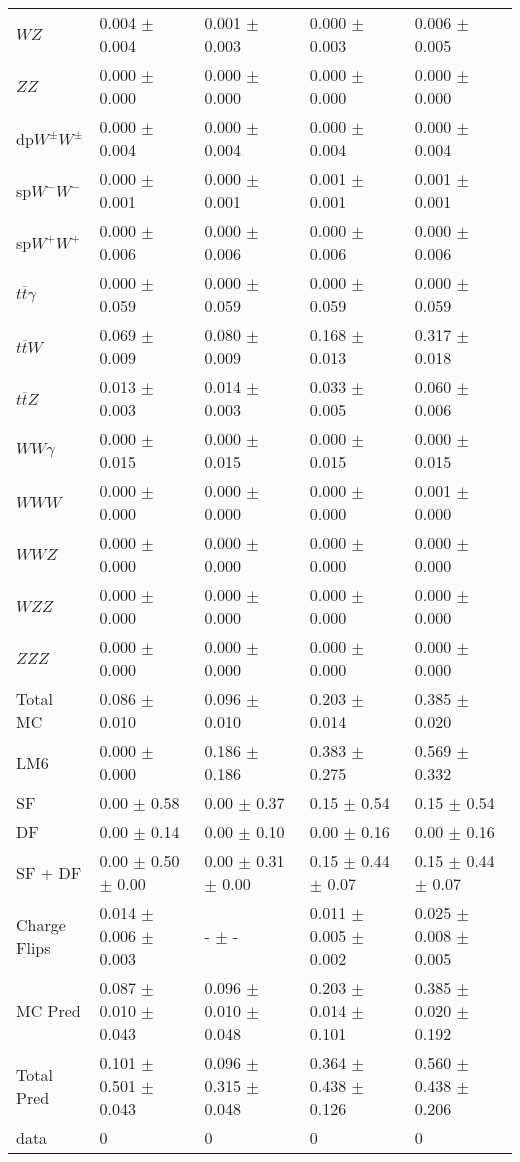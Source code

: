 \begin{tabular}{l | l l l l}
$WZ$ &  0.004 $\pm$  0.004 &  0.001 $\pm$  0.003 &   0.000 $\pm$  0.003 &  0.006 $\pm$  0.005\\
$ZZ$ &  0.000 $\pm$   0.000 &  0.000 $\pm$   0.000 &   0.000 $\pm$   0.000 &   0.000 $\pm$   0.000\\
\hline
dp$W^{\pm}W^{\pm}$ &  0.000 $\pm$  0.004 &  0.000 $\pm$  0.004 &  0.000 $\pm$  0.004 &  0.000 $\pm$  0.004\\
sp$W^{-}W^{-}$ &  0.000 $\pm$  0.001 &  0.000 $\pm$  0.001 &  0.001 $\pm$  0.001 &  0.001 $\pm$  0.001\\
sp$W^{+}W^{+}$ &  0.000 $\pm$  0.006 &  0.000 $\pm$  0.006 &  0.000 $\pm$  0.006 &  0.000 $\pm$  0.006\\
$t\overline{t}\gamma$ &  0.000 $\pm$  0.059 &  0.000 $\pm$  0.059 &  0.000 $\pm$  0.059 &  0.000 $\pm$  0.059\\
$t\overline{t}W$ &  0.069 $\pm$  0.009 &  0.080 $\pm$  0.009 &  0.168 $\pm$  0.013 &  0.317 $\pm$  0.018\\
$t\overline{t}Z$ &  0.013 $\pm$  0.003 &  0.014 $\pm$  0.003 &  0.033 $\pm$  0.005 &  0.060 $\pm$  0.006\\
$WW\gamma$ &  0.000 $\pm$  0.015 &  0.000 $\pm$  0.015 &  0.000 $\pm$  0.015 &  0.000 $\pm$  0.015\\
$WWW$ &  0.000 $\pm$   0.000 &   0.000 $\pm$   0.000 &   0.000 $\pm$   0.000 &  0.001 $\pm$   0.000\\
$WWZ$ &  0.000 $\pm$   0.000 &  0.000 $\pm$   0.000 &  0.000 $\pm$   0.000 &  0.000 $\pm$   0.000\\
$WZZ$ &   0.000 $\pm$   0.000 &  0.000 $\pm$   0.000 &   0.000 $\pm$   0.000 &   0.000 $\pm$   0.000\\
$ZZZ$ &  0.000 $\pm$   0.000 &  0.000 $\pm$   0.000 &  0.000 $\pm$   0.000 &  0.000 $\pm$   0.000\\
\hline
Total MC &  0.086 $\pm$  0.010 &  0.096 $\pm$  0.010 &  0.203 $\pm$  0.014 &  0.385 $\pm$  0.020\\
\hline\hline
\hline
LM6 &  0.000 $\pm$  0.000 &  0.186 $\pm$  0.186 &  0.383 $\pm$  0.275 &  0.569 $\pm$  0.332\\
\hline\hline
\hline\hline
 SF  & 0.00 $\pm$ 0.58 & 0.00 $\pm$ 0.37 & 0.15 $\pm$ 0.54 & 0.15 $\pm$ 0.54\\
 DF  & 0.00 $\pm$ 0.14 & 0.00 $\pm$ 0.10 & 0.00 $\pm$ 0.16 & 0.00 $\pm$ 0.16\\
\hline
 SF + DF  & 0.00 $\pm$ 0.50 $\pm$ 0.00 & 0.00 $\pm$ 0.31 $\pm$ 0.00 & 0.15 $\pm$ 0.44 $\pm$ 0.07 & 0.15 $\pm$ 0.44 $\pm$ 0.07\\
\hline\hline
Charge Flips & 0.014 $\pm$ 0.006 $\pm$ 0.003 & - $\pm$ - & 0.011 $\pm$ 0.005 $\pm$ 0.002 & 0.025 $\pm$ 0.008 $\pm$ 0.005\\
\hline\hline
\hline
MC Pred &  0.087 $\pm$  0.010 $\pm$  0.043 &  0.096 $\pm$  0.010 $\pm$  0.048 &  0.203 $\pm$  0.014 $\pm$  0.101 &  0.385 $\pm$  0.020 $\pm$  0.192\\
\hline\hline
Total Pred &  0.101 $\pm$  0.501 $\pm$  0.043 &  0.096 $\pm$  0.315 $\pm$  0.048 &  0.364 $\pm$  0.438 $\pm$  0.126 &  0.560 $\pm$  0.438 $\pm$  0.206\\
\hline\hline
data & 0 & 0 & 0 & 0\\
\hline\hline
\end{tabular}
